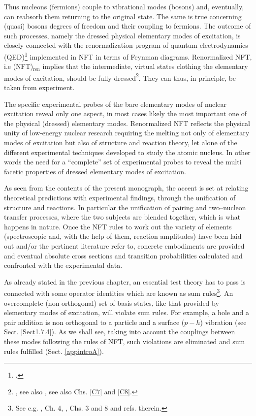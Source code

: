  
 Thus nucleons (fermions)  couple to  vibrational modes (bosons) and, eventually, can reabsorb them returning to the original state. The same is true concerning (quasi) bosons degrees of freedom and their coupling to fermions.  The outcome of such processes, namely the dressed physical elementary modes of excitation, is closely connected with the renormalization program of quantum electrodynamics (QED)\footnote{\cite{Feynman:75,Schwinger:01}.} implemented in NFT in terms of Feynman diagrams. Renormalized NFT, i.e (NFT)$_{\text{ren}}$ implies that the intermediate, virtual states clothing the elementary modes of excitation, should be fully dressed\footnote{\cite{Barranco:17}, see also \cite{Broglia:16}, see also Chs. \ref{C7} and \ref{C8}.}. They can thus, in principle, be taken from experiment. 
  
 
  The specific experimental probes of the bare elementary modes of nuclear excitation reveal only one aspect, in most cases likely the most important one of the physical (dressed) elementary modes. Renormalized NFT  reflects the physical unity of  low-energy nuclear research requiring the melting not only of elementary modes of excitation but also of structure and reaction theory, let alone of the different experimental techniques developed to study the atomic nucleus. In other words the need for a ``complete'' set of experimental probes to reveal the multi facetic properties of dressed elementary modes of excitation.

As  seen from the contents of the present monograph, the accent is set at relating theoretical predictions with experimental findings, through the unification of structure and reactions. In particular the unification of pairing and two--nucleon transfer processes, where the two subjects are blended together, which is what happens in nature.  Once the NFT rules to work out the variety of elements (spectroscopic and, with the help of them, reaction amplitudes) have been laid  out and/or the pertinent literature refer to, concrete embodiments are provided and eventual absolute cross sections and transition probabilities calculated and confronted with the experimental data. 


As already stated in the previous chapter, an essential test theory has to pass is connected  with some operator identities which are known as sum rules\footnote{See e.g. \cite{Bohr:75,Ring:80}, \cite{Bertsch:05} Ch. 4, \cite{Bortignon:98}, Chs. 3 and 8 and refs. therein.}. An overcomplete (non-orthogonal) set of basis states, like that provided by elementary modes of excitation, will violate sum rules. For example, a hole and a pair addition  is non orthogonal to a particle and a surface ($p-h$) vibration (see  Sect. \ref{Sect1.7.4}). As we shall see, taking into account the couplings between these modes following the rules of NFT,   such violations are eliminated and sum rules fulfilled (Sect. \ref{appintroA}).

